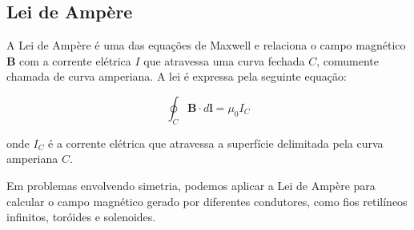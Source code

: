 \documentclass[12pt]{article}
\begin{document}
\subsection{Lei de Ampère}

A Lei de Ampère é uma das equações de Maxwell e relaciona o campo magnético \(\mathbf{B}\) com a corrente elétrica \(I\) que atravessa uma curva fechada \(C\), comumente chamada de curva amperiana. A lei é expressa pela seguinte equação:

\begin{equation}
    \boxed{\oint_{C} \mathbf{B} \cdot d\mathbf{l} = \mu_0 I_{C}}
\end{equation}

\noindent onde \(I_{C}\) é a corrente elétrica que atravessa a superfície delimitada pela curva amperiana \(C\).

Em problemas envolvendo simetria, podemos aplicar a Lei de Ampère para calcular o campo magnético gerado por diferentes condutores, como fios retilíneos infinitos, toróides e solenoides.
\end{document}
